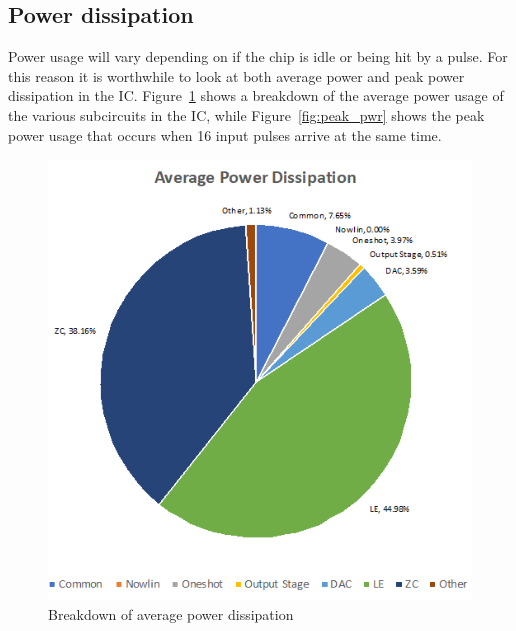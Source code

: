 \documentclass[12pt,oneside,final]{siuethesis}
\theoremstyle{definition}
\begin{document}
\subsection{Power dissipation}
\par Power usage will vary depending on if the chip is idle or being hit by a pulse. For this reason it is worthwhile to look at both average power and peak power dissipation in the IC. Figure~\ref{fig:avg_pwr} shows a breakdown of the average power usage of the various subcircuits in the IC, while Figure~\ref{fig:peak_pwr} shows the peak power usage that occurs when 16 input pulses arrive at the same time.
\begin{figure}[htbp!]
 \centering
 \includegraphics[scale=1]{./ch4_figures/average_power.png}
 \caption{Breakdown of average power dissipation}
 \label{fig:avg_pwr}
\end{figure} 
\end{document}
